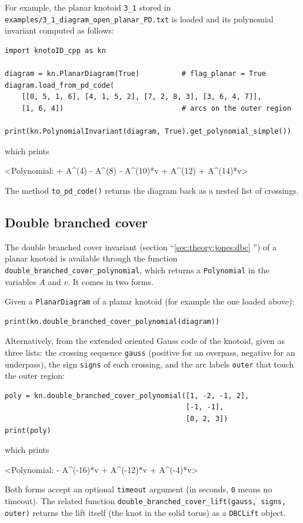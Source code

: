 For example, the planar knotoid \lstinline{3_1} stored in \lstinline{examples/3_1_diagram_open_planar_PD.txt} is loaded and its polynomial invariant computed as follows:
\begin{lstlisting}
import knotoID_cpp as kn

diagram = kn.PlanarDiagram(True)          # flag_planar = True
diagram.load_from_pd_code(
    [[0, 5, 1, 6], [4, 1, 5, 2], [7, 2, 8, 3], [3, 6, 4, 7]],
    [1, 6, 4])                            # arcs on the outer region

print(kn.PolynomialInvariant(diagram, True).get_polynomial_simple())
\end{lstlisting}
which prints
\begin{lstlistingsmall}
<Polynomial: + A^(4) - A^(8) - A^(10)*v + A^(12) + A^(14)*v>
\end{lstlistingsmall}
The method \lstinline{to_pd_code()} returns the diagram back as a nested list of crossings.

\subsection{\label{sec:python:dbc}Double branched cover}
The double branched cover invariant (section ``\ref{sec:theory:jones:dbc} '') of a planar knotoid is available through the function \lstinline{double_branched_cover_polynomial}, which returns a \lstinline{Polynomial} in the variables $A$ and $v$. It comes in two forms.

Given a \lstinline{PlanarDiagram} of a planar knotoid (for example the one loaded above):
\begin{lstlisting}
print(kn.double_branched_cover_polynomial(diagram))
\end{lstlisting}
Alternatively, from the extended oriented Gauss code of the knotoid, given as three lists: the crossing sequence \lstinline{gauss} (positive for an overpass, negative for an underpass), the sign \lstinline{signs} of each crossing, and the arc labels \lstinline{outer} that touch the outer region:
\begin{lstlisting}
poly = kn.double_branched_cover_polynomial([1, -2, -1, 2],
                                           [-1, -1],
                                           [0, 2, 3])
print(poly)
\end{lstlisting}
which prints
\begin{lstlistingsmall}
<Polynomial: - A^(-16)*v + A^(-12)*v + A^(-4)*v>
\end{lstlistingsmall}
Both forms accept an optional \lstinline{timeout} argument (in seconds, \lstinline{0} means no timeout). The related function \lstinline{double_branched_cover_lift(gauss, signs, outer)} returns the lift itself (the knot in the solid torus) as a \lstinline{DBCLift} object.


